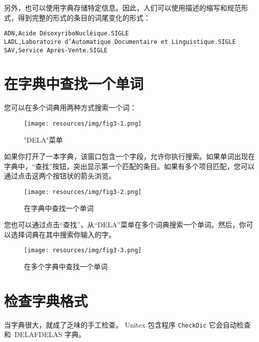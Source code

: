 另外，也可以使用字典存储特定信息。因此，人们可以使用描述的缩写和规范形式，得到完整的形式的条目的词尾变化的形式：

\bigskip
\begin{verbatim}
ADN,Acide DésoxyriboNucléique.SIGLE
LADL,Laboratoire d’Automatique Documentaire et Linguistique.SIGLE
SAV,Service Après-Vente.SIGLE
\end{verbatim}



\section{在字典中查找一个单词}
\label{section-dictionary-lookup}
您可以在多个词典用两种方式搜索一个词：

\begin{figure}[h!]
\begin{center}
\texttt{[image: resources/img/fig3-1.png]}
\caption{"DELA"菜单}
\end{center}
\end{figure}

\bigskip
\noindent
如果你打开了一本字典，该窗口包含一个字段，允许你执行搜索。如果单词出现在字典中，“查找”按钮，突出显示第一个匹配的条目。如果有多个项目匹配，您可以通过点击这两个按钮状的箭头浏览。
\begin{figure}[h!]
\begin{center}
\texttt{[image: resources/img/fig3-2.png]}
\caption{在字典中查找一个单词}
\end{center}
\end{figure}

\bigskip
\noindent
您也可以通过点击“查找”，从“DELA”菜单在多个词典搜索一个单词。然后，你可以选择词典在其中搜索你输入的字。

\begin{figure}[h!]
\begin{center}
\texttt{[image: resources/img/fig3-3.png]}
\caption{在多个字典中查找一个单词}
\end{center}
\end{figure}

\bigskip
\noindent





\section{检查字典格式}
 
当字典很大，就成了乏味的手工检查。 Unitex 包含程序 \verb+CheckDic+
 它会自动检查和\ DELAFDELAS 字典。

